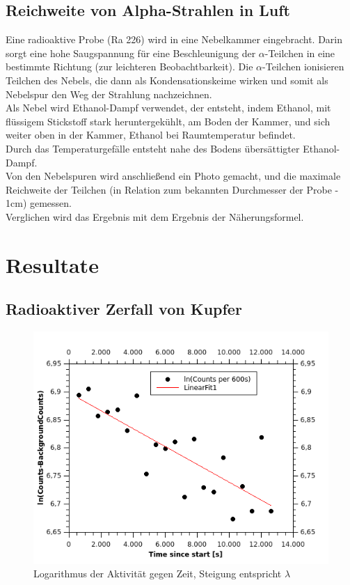 \documentclass[12pt,a4paper]{article}
\begin{document}
\begin{multicols}{2}
\subsection{Reichweite von Alpha-Strahlen in Luft}

Eine radioaktive Probe (Ra 226) wird in eine Nebelkammer eingebracht. Darin sorgt eine hohe Saugspannung für eine Beschleunigung der $\alpha$-Teilchen in eine bestimmte Richtung (zur leichteren Beobachtbarkeit). Die $\alpha$-Teilchen ionisieren Teilchen des Nebels, die dann als Kondensationskeime wirken und somit als Nebelspur den Weg der Strahlung nachzeichnen.\\
Als Nebel wird Ethanol-Dampf verwendet, der entsteht, indem Ethanol, mit flüssigem Stickstoff stark heruntergekühlt, am Boden der Kammer, und sich weiter oben in der Kammer, Ethanol bei Raumtemperatur befindet.\\
Durch das Temperaturgefälle entsteht nahe des Bodens übersättigter Ethanol-Dampf.\\

\noindent Von den Nebelspuren wird anschließend ein Photo gemacht, und die maximale Reichweite der Teilchen (in Relation zum bekannten Durchmesser der Probe - 1cm) gemessen.\\
Verglichen wird das Ergebnis mit dem Ergebnis der Näherungsformel.


\pagebreak
\section{Resultate}
\subsection{Radioaktiver Zerfall von Kupfer}
\end{multicols}
\begin{figure}[H]
	\centering
	\includegraphics[scale=2.5]{./figures/kupfer_zerfall_ergebnis.png}
	\caption{Logarithmus der Aktivität gegen Zeit, Steigung entspricht $\lambda$}
	\label{fig:kupferzerfall_erg}
\end{figure}
\end{document}
